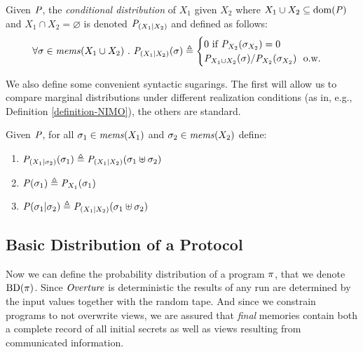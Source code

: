 \begin{definition}
  Given $\mathit{P}$, the \emph{conditional distribution}
  of $X_1$ given $X_2$ where $X_1 \cup X_2 \subseteq \mathrm{dom}(\mathit{P})$ and $X_1 \cap X_2 = \varnothing$
  is denoted $\mathit{P}_{({X_1}|{X_2})}$ and defined as follows:
  $$
  \forall \store \in \mems(X_1 \cup X_2)\ .\ 
  \condd{\pmf}{X_1}{X_2}(\store) \defeq
  \begin{cases}
    0 \text{\ if\ } \margd{\pmf}{X_2}(\store_{X_2}) = 0\\
    \margd{\pmf}{X_1 \cup X_2}(\store) / \margd{\pmf}{X_2}(\store_{X_2})\ \text{\ o.w.}
  \end{cases}
  $$
\end{definition}
We also define some convenient syntactic sugarings. The first will allow us to
compare marginal distributions under different realization conditions
(as in, e.g., Definition \ref{definition-NIMO}), the others are standard.
\begin{definition}
  Given $\mathit{P}$, for all $\sigma_1 \in \mathit{mems}(X_1)$ and $\sigma_2 \in \mathit{mems}(X_2)$ define:
  \begin{enumerate}
  \item $\mathit{P}_{({X_1}|{\sigma_2})}(\sigma_1) \triangleq \mathit{P}_{({X_1}|{X_2})}(\sigma_1 \uplus \sigma_2)$
  \item $\mathit{P}(\sigma_1)  \triangleq {\mathit{P}}_{X_1}(\sigma_1)$ 
  \item $\mathit{P}(\sigma_1|\sigma_2) \triangleq \mathit{P}_{({X_1}|{X_2})}(\sigma_1 \uplus \sigma_2)$
  \end{enumerate}
\end{definition}

\subsection{Basic Distribution of a Protocol}
Now we can define the probability distribution of a program $\pi$,
that we denote $\mathrm{BD}(\pi)$. Since $\mathit{Overture}$ is deterministic the
results of any run are determined by the input values together with
the random tape. And since we constrain programs to not overwrite
views, we are assured that \emph{final} memories contain both a
complete record of all initial secrets as well as views resulting from
communicated information. 

